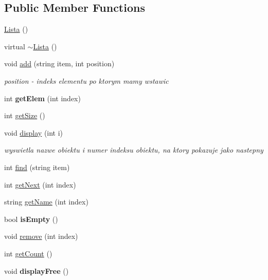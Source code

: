 \subsection*{Public Member Functions}
\begin{DoxyCompactItemize}
\item 
\hyperlink{class_lista_a1f668b36909182ef1360b48503529a31}{Lista} ()
\item 
virtual \hyperlink{class_lista_a4d7394b2728a00ad8404965b2e15d096}{$\sim$\-Lista} ()
\item 
void \hyperlink{class_lista_a537b5b7bdf21c955ced1da3805bf358a}{add} (string item, int position)
\begin{DoxyCompactList}\small\item\em position -\/ indeks elementu po ktorym mamy wstawic \end{DoxyCompactList}\item 
\hypertarget{class_lista_ac7c04bb24ccf464d2fef9d81fd9a02dd}{int {\bfseries get\-Elem} (int index)}\label{class_lista_ac7c04bb24ccf464d2fef9d81fd9a02dd}

\item 
int \hyperlink{class_lista_a8aa86fb2487cf9cb9167da8853ca3302}{get\-Size} ()
\item 
void \hyperlink{class_lista_a5ef1a17973150accfd4a090ef3523552}{display} (int i)
\begin{DoxyCompactList}\small\item\em wyswietla nazwe obiektu i numer indeksu obiektu, na ktory pokazuje jako nastepny \end{DoxyCompactList}\item 
int \hyperlink{class_lista_a292906bc7cfcf660965e4473031eab58}{find} (string item)
\item 
int \hyperlink{class_lista_af60ba64ffa74c296db48be95d3c3e631}{get\-Next} (int index)
\item 
string \hyperlink{class_lista_a6982ae8c93f39ceeec64a28eabf1f941}{get\-Name} (int index)
\item 
\hypertarget{class_lista_ac32257be6a2943e935709d1503b7214a}{bool {\bfseries is\-Empty} ()}\label{class_lista_ac32257be6a2943e935709d1503b7214a}

\item 
void \hyperlink{class_lista_a58de0d55144cbe5ef946068724ee3e2a}{remove} (int index)
\item 
int \hyperlink{class_lista_af69b912fbb339fb976c1d02c1ec2a5ed}{get\-Count} ()
\item 
\hypertarget{class_lista_a687d55dc856ba92c3ece5be4c241f36f}{void {\bfseries display\-Free} ()}\label{class_lista_a687d55dc856ba92c3ece5be4c241f36f}

\end{DoxyCompactItemize}


